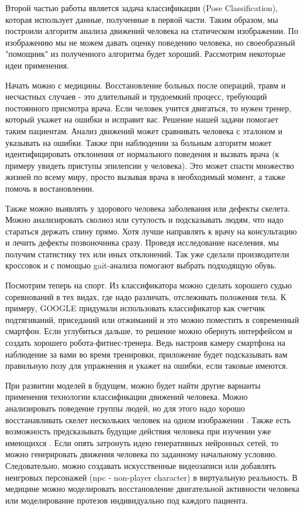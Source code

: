 \hfill \break
Второй частью работы является задача классификации (Pose Classification), которая использует данные, полученные в первой части. Таким образом, мы построили алгоритм анализа движений человека на статическом изображении. По изображению мы не можем давать оценку поведению человека, но своеобразный "помощник"{} из полученного алгоритма будет хороший. Рассмотрим некоторые идеи применения.

Начать можно с медицины. Восстановление больных после операций, травм и несчастных случаев - это длительный и трудоемкий процесс, требующий постоянного присмотра врача. Если человек учится двигаться, то нужен тренер, который укажет  на ошибки и исправит вас. Решение нашей задачи помогает таким пациентам. Анализ движений может сравнивать человека с эталоном и указывать на ошибки. Также при наблюдении за больным алгоритм может идентифицировать отклонения от нормального поведения и вызвать врача (к примеру увидеть приступы эпилепсии у человека). Это может спасти множество жизней по всему миру, просто вызывая врача в необходимый момент, а также помочь в востановлении.

Также можно выявлять у здорового человека заболевания или дефекты скелета. Можно анализировать сколиоз или сутулость и подсказывать людям, что надо стараться держать спину прямо. Хотя лучше направлять к врачу на консультацию и лечить дефекты позвоночника сразу. Проведя исследование населения, мы получим статистику тех или иных отклонений. Так уже сделали производители кроссовок и с помощью gait-анализа \cite{WHITTLE1996369} помогают выбрать подходящую обувь.

Посмотрим теперь на спорт. Из классификатора можно сделать хорошего судью соревнований в тех видах, где надо различать, отслеживать положения тела. К примеру, GOOGLE придумали использовать классификатор как счетчик подтягиваний, приседаний или отжиманий \cite{counter} и это можно поместить в современный смартфон. Если углубиться дальше, то решение можно обернуть интерфейсом и создать хорошего робота-фитнес-тренера. Ведь настроив камеру смартфона на наблюдение за вами во время тренировки, приложение будет подсказывать вам правильную позу для упражнения и укажет на ошибки, если таковые имеются.

\hfill \break
При развитии моделей в будущем, можно будет найти другие варианты применения технологии классификации движений человека. Можно анализировать поведение группы людей, но для этого надо хорошо восстанавливать скелет нескольких человек на одном изображении \cite{8765346} \cite{https://doi.org/10.48550/arxiv.1807.04067} \cite{fang2017rmpe}. Также есть возможность предсказывать будущие действия человека при изучении уже имеющихся \cite{s20174944}. Если опять затронуть идею генеративных нейронных сетей, то можно генерировать движения человека по заданному начальному условию. Следовательно, можно создавать искусственные видеозаписи или добавлять неигровых персонажей (npc - non-player character) в виртуальную реальность. В медицине можно моделировать восстановление двигательной активности человека или моделирование протезов индивидуально под каждого пациента.

